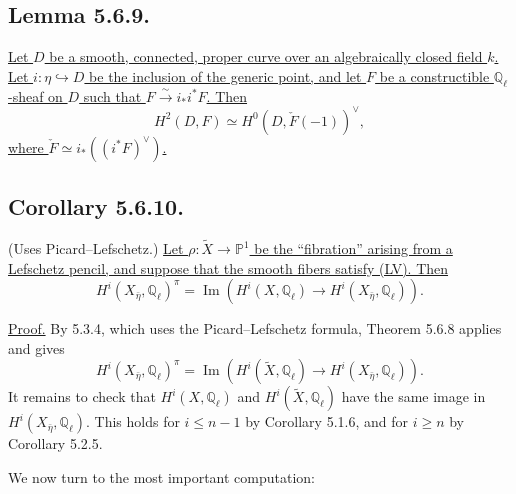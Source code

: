 \subsection*{Lemma 5.6.9.}
\underline{Let $D$ be a smooth, connected, proper curve over an
algebraically closed field $k$.  Let $i:\eta\hookrightarrow D$ be the
inclusion of the generic point, and let $F$ be a constructible
$\mathbb Q_\ell$-sheaf on $D$ such that
$F\overset{\sim}{\longrightarrow}i_*i^*F$.  Then}
\[
H^2(D,F)\simeq H^0(D,\check F(-1))^\vee,
\]
\underline{where $\check F\simeq i_*((i^*F)^\vee)$.}

\subsection*{Corollary 5.6.10.}
\textup{(Uses Picard--Lefschetz.)}
\underline{Let $\rho:\widetilde X\to\mathbb P^1$ be the
\textquotedblleft fibration\textquotedblright{} arising from a Lefschetz
pencil, and suppose that the smooth fibers satisfy (LV).  Then}
\begin{equation}\tag{5.6.10.1}
H^i(X_{\bar\eta},\mathbb Q_\ell)^\pi
=\operatorname{Im}\!\left(
H^i(X,\mathbb Q_\ell)\longrightarrow
H^i(X_{\bar\eta},\mathbb Q_\ell)
\right).
\end{equation}

\underline{Proof.}
By 5.3.4, which uses the Picard--Lefschetz formula, Theorem 5.6.8 applies
and gives
\[
H^i(X_{\bar\eta},\mathbb Q_\ell)^\pi
=\operatorname{Im}\!\left(
H^i(\widetilde X,\mathbb Q_\ell)\longrightarrow
H^i(X_{\bar\eta},\mathbb Q_\ell)
\right).
\]
It remains to check that $H^i(X,\mathbb Q_\ell)$ and
$H^i(\widetilde X,\mathbb Q_\ell)$ have the same image in
$H^i(X_{\bar\eta},\mathbb Q_\ell)$.  This holds for $i\leq n-1$ by
Corollary 5.1.6, and for $i\geq n$ by Corollary 5.2.5.

We now turn to the most important computation:
